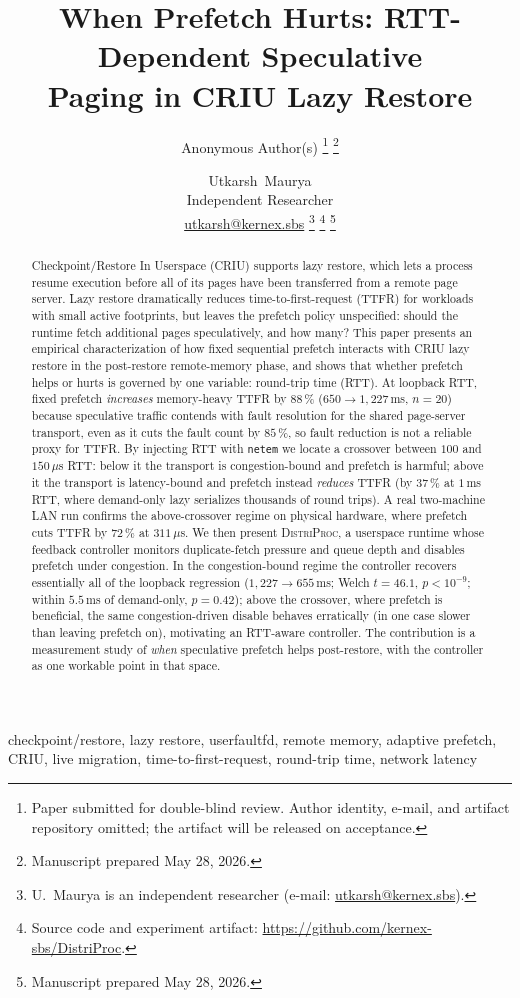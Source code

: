 \documentclass[journal]{IEEEtran}
\title{When Prefetch Hurts: RTT-Dependent Speculative\\Paging in CRIU Lazy Restore}
\author{Anonymous Author(s)%
\thanks{Paper submitted for double-blind review. Author identity, e-mail, and
artifact repository omitted; the artifact will be released on acceptance.}%
\thanks{Manuscript prepared May 28, 2026.}}
\author{Utkarsh~Maurya\\[2pt]
{\normalfont\normalsize Independent Researcher}\\[1pt]
{\normalfont\normalsize\href{mailto:utkarsh@kernex.sbs}{utkarsh@kernex.sbs}}%
\thanks{U.~Maurya is an independent researcher
(e-mail: \href{mailto:utkarsh@kernex.sbs}{utkarsh@kernex.sbs}).}%
\thanks{Source code and experiment artifact:
\url{https://github.com/kernex-sbs/DistriProc}.}%
\thanks{Manuscript prepared May 28, 2026.}}
\newcommand{\distriproc}{\textsc{DistriProc}\xspace}
\begin{document}
\maketitle
\IEEEpeerreviewmaketitle

\begin{abstract}
Checkpoint/Restore In Userspace (CRIU) supports lazy restore, which lets a
process resume execution before all of its pages have been transferred from a
remote page server. Lazy restore dramatically reduces time-to-first-request
(TTFR) for workloads with small active footprints, but leaves the prefetch
policy unspecified: should the runtime fetch additional pages speculatively,
and how many?
This paper presents an empirical characterization of how fixed sequential
prefetch interacts with CRIU lazy restore in the post-restore remote-memory
phase, and shows that whether prefetch helps or hurts is governed by one
variable: round-trip time (RTT). At loopback RTT, fixed prefetch
\emph{increases} memory-heavy TTFR by $88\,\%$ ($650\!\to\!1{,}227$\,ms,
$n\!=\!20$) because speculative traffic contends with fault resolution for the
shared page-server transport, even as it cuts the fault count by $85\,\%$, so
fault reduction is not a reliable proxy for TTFR. By injecting RTT with
\texttt{netem} we locate a crossover between $100$ and $150\,\mu$s RTT: below it
the transport is congestion-bound and prefetch is harmful; above it the
transport is latency-bound and prefetch instead \emph{reduces} TTFR (by
$37\,\%$ at $1$\,ms RTT, where demand-only lazy serializes thousands of
round trips). A real two-machine LAN run confirms the above-crossover regime
on physical hardware, where prefetch cuts TTFR by $72\,\%$ at $311\,\mu$s.
We then present \distriproc, a userspace runtime whose
feedback controller monitors duplicate-fetch pressure and queue depth and
disables prefetch under congestion. In the congestion-bound regime the
controller recovers essentially all of the loopback regression
($1{,}227\!\to\!655$\,ms; Welch $t\!=\!46.1$, $p<10^{-9}$; within $5.5$\,ms
of demand-only, $p\!=\!0.42$); above the crossover, where prefetch is
beneficial, the same congestion-driven disable behaves erratically (in one
case slower than leaving prefetch on), motivating an RTT-aware controller. The contribution is a
measurement study of \emph{when} speculative prefetch helps post-restore,
with the controller as one workable point in that space.
\end{abstract}

\begin{IEEEkeywords}
checkpoint/restore, lazy restore, userfaultfd, remote memory, adaptive
prefetch, CRIU, live migration, time-to-first-request, round-trip time,
network latency
\end{IEEEkeywords}
\end{document}
